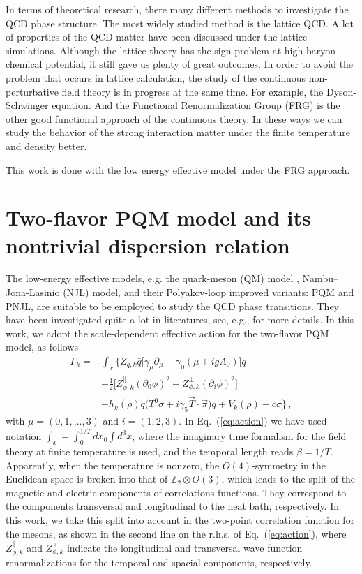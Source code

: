 \documentclass[%
reprint,
superscriptaddress,
showpacs,preprintnumbers,
 amsmath,amssymb,
 aps,
prd,
]{revtex4-1}
\def\Eq#1{Eq.~(\ref{#1})}
\begin{document}
In terms of theoretical research, there many different methods to investigate the QCD phase structure. The most widely studied method is the lattice QCD. A lot of properties of the QCD matter have been discussed under the lattice simulations. Although the lattice theory has the sign problem at high baryon chemical potential, it still gave us plenty of great outcomes. In order to avoid the problem that occurs in lattice calculation, the study of the continuous non-perturbative field theory is in progress at the same time. For example, the Dyson-Schwinger equation. And the Functional Renormalization Group (FRG) is the other good functional approach of the continuous theory. In these ways we can study the behavior of the strong interaction matter under the finite temperature and density better.

This work is done with the low energy effective model under the FRG approach. 






\section{Two-flavor PQM model and its nontrivial dispersion relation}
\label{sec:PQM}

The low-energy effective models, e.g. the quark-meson (QM) model \cite{Schaefer:2004en}, Nambu--Jona-Lasinio (NJL) model, and their Polyakov-loop improved variants: PQM and PNJL, are suitable to be employed to study the QCD phase transitions. They have been investigated quite a lot in literatures, see, e.g., \cite{} for more details. In this work, we adopt the scale-dependent effective action for the two-flavor PQM model, as follows 
\begin{align}
\Gamma_k=&\int_x \bigg\{Z_{q,k}\bar{q} \Big [\gamma_\mu \partial_\mu -\gamma_0(\mu+igA_0) \Big ]q \nonumber\\[2ex]
&+\frac{1}{2}\Big [Z_{\phi,k}^{\parallel}(\partial_0 \phi)^2+Z_{\phi,k}^{\perp}(\partial_i \phi)^2 \Big]\nonumber\\[2ex]
&+h_k(\rho)\bar{q}\big(T^0\sigma+i\gamma_5\vec{T}\cdot \vec{\pi}\big)q+V_k(\rho)-c\sigma \bigg\}\,,\label{eq:action}
\end{align}
with $\mu=(0, 1, ..., 3)$ and $i=(1, 2, 3)$. In \Eq{eq:action} we have used notation $\int_{x}=\int_0^{1/T}d x_0 \int d^3 x$, where the imaginary time formalism for the field theory at finite temperature is used, and the temporal length reads $\beta=1/T$. Apparently, when the temperature is nonzero, the $O(4)$-symmetry in the Euclidean space is broken into that of $\mathbb{Z}_2\otimes O(3)$, which leads to the split of the magnetic and electric components of correlations functions. They correspond to the components transversal and longitudinal to the heat bath, respectively. In this work, we take this split into account in the two-point correlation function for the mesons, as shown in the second line on the r.h.s. of \Eq{eq:action}, where $Z_{\phi,k}^{\parallel}$ and $Z_{\phi,k}^{\perp}$ indicate the longitudinal and transversal wave function renormalizations for the temporal and spacial components, respectively. 
\end{document}
